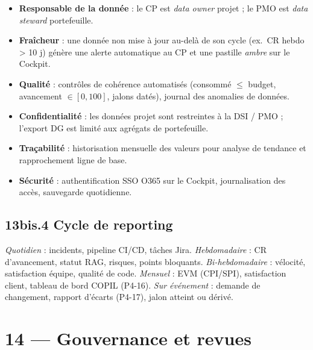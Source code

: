 \documentclass[11pt,a4paper,oneside]{report}
\begin{document}
\begin{itemize}\setlength{\itemsep}{2pt}
  \item \textbf{Responsable de la donnée} : le CP est \textit{data owner} projet ; le PMO
  est \textit{data steward} portefeuille.
  \item \textbf{Fraîcheur} : une donnée non mise à jour au-delà de son cycle (ex.\ CR hebdo
  > 10 j) génère une alerte automatique au CP et une pastille \textit{ambre} sur le
  Cockpit.
  \item \textbf{Qualité} : contrôles de cohérence automatisés (consommé $\leq$ budget,
  avancement $\in [0,100]$, jalons datés), journal des anomalies de données.
  \item \textbf{Confidentialité} : les données projet sont restreintes à la DSI / PMO ;
  l'export DG est limité aux agrégats de portefeuille.
  \item \textbf{Traçabilité} : historisation mensuelle des valeurs pour analyse de
  tendance et rapprochement ligne de base.
  \item \textbf{Sécurité} : authentification SSO O365 sur le Cockpit, journalisation des
  accès, sauvegarde quotidienne.
\end{itemize}

\subsection*{13bis.4 Cycle de reporting}

\textit{Quotidien} : incidents, pipeline CI/CD, tâches Jira. \quad
\textit{Hebdomadaire} : CR d'avancement, statut RAG, risques, points bloquants. \quad
\textit{Bi-hebdomadaire} : vélocité, satisfaction équipe, qualité de code. \quad
\textit{Mensuel} : EVM (CPI/SPI), satisfaction client, tableau de bord COPIL (P4-16). \quad
\textit{Sur événement} : demande de changement, rapport d'écarts (P4-17), jalon atteint ou
dérivé.

\section*{14 — Gouvernance et revues}
\end{document}

